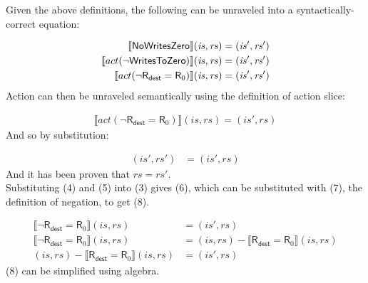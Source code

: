 \documentclass[12pt, letterpaper]{article}
\newcommand\interp[1]{\llbracket #1 \rrbracket}
\begin{document}
    Given the above definitions, the following can be unraveled into a syntactically-correct equation:
\par\nobreak
{\small
\begin{align}
    \setcounter{equation}{0}
    \interp{ \mathsf{NoWritesZero} } (\mathit{is}, \mathit{rs}) 
    &=
    (\mathit{is}', \mathit{rs}')
    \\
    \interp{ act(\neg \mathsf{WritesToZero}) } (\mathit{is}, \mathit{rs}) 
    &=
    (\mathit{is}', \mathit{rs}')
    \\
    \interp{ act(\neg \mathsf{R}_{\mathsf{dest}} = \mathsf{R}_0) } (\mathit{is}, \mathit{rs}) 
    &=
    (\mathit{is}', \mathit{rs}')
\end{align}
}
    Action can then be unraveled semantically using the definition of action slice:
\par\nobreak
{\small
\begin{align}
    \interp{ act(\neg \mathsf{R}_{\mathsf{dest}} = \mathsf{R}_0) } (\mathit{is}, \mathit{rs}) 
    =
    (\mathit{is}', \mathit{rs})
\end{align}
}
    And so by substitution:
\par\nobreak
{\small
\begin{align}
    (\mathit{is}', \mathit{rs}')
    &=
    (\mathit{is}', \mathit{rs})
\end{align}
}
    And it has been proven that $\mathit{rs} = \mathit{rs'}$.\\
    Substituting (4) and (5) into (3) gives (6), which can be substituted with (7), the definition of negation, to get (8). 
\par\nobreak
{\small
\begin{align}
    \interp{ \neg \mathsf{R}_{\mathsf{dest}} = \mathsf{R}_0 } (\mathit{is}, \mathit{rs}) 
    &=
    (\mathit{is}', \mathit{rs})\\
    \interp{ \neg \mathsf{R}_{\mathsf{dest}} = \mathsf{R}_0 } (\mathit{is}, \mathit{rs}) 
    &=
    (\mathit{is}, \mathit{rs}) - \interp{ \mathsf{R}_{\mathsf{dest}} = \mathsf{R}_0 } (\mathit{is}, \mathit{rs})\\ %
    (\mathit{is}, \mathit{rs}) - \interp{ \mathsf{R}_{\mathsf{dest}} = \mathsf{R}_0 } (\mathit{is}, \mathit{rs}) 
    &=
    (\mathit{is}', \mathit{rs})
\end{align}
}
    (8) can be simplified using algebra.
\par\nobreak
\end{document}
